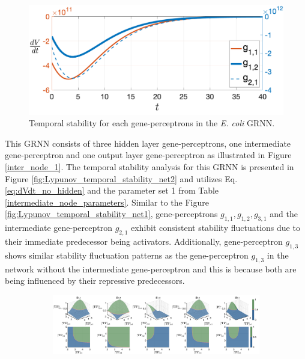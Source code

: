 \documentclass[twocolumn]{biophys-new}
\begin{document}
{{\begin{figure}[t!] %
\centering
\includegraphics[width=0.8\linewidth]{figures/temporal_stab_net3.pdf}
\caption{Temporal stability for each gene-perceptrons in the \emph{E. coli} GRNN. }
\label{fig:Lypunov_temporal_stability_net3}
\vspace{-0.5em}
\end{figure}

This GRNN consists of three hidden layer gene-perceptrons, one intermediate gene-perceptron and one output layer gene-perceptron as illustrated in Figure \ref{inter_node_1}. 
The temporal stability analysis for this GRNN is presented in Figure \ref{fig:Lypunov_temporal_stability_net2} and utilizes Eq. \ref{eq:dVdt_no_hidden}  and the parameter set 1 from Table \ref{intermediate_node_parameters}. Similar to the Figure \ref{fig:Lypunov_temporal_stability_net1},  gene-perceptrons $g_{1,1}, g_{1,2}, g_{3,1}$ and the intermediate gene-perceptron $g_{2,1}$ exhibit consistent stability fluctuations due to  their immediate predecessor being activators. Additionally, gene-perceptron $g_{1,3}$ shows similar stability fluctuation patterns as the gene-perceptron $g_{1,3}$ in the network without the intermediate gene-perceptron and this is because both are being influenced by their repressive predecessors.    

\begin{figure}[!t] %
\centering

\begin{subfigure}{0.9\textwidth}
    \includegraphics[width=\textwidth]{figures/inter_node_para_set-1.pdf}
    \caption{}
    \label{fig:inter_node_para_set_1}
\end{subfigure}


\end{figure}}}
\end{document}
